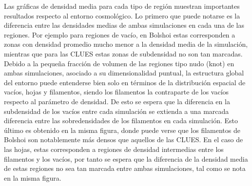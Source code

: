 Las gráficas de densidad media para cada tipo de región muestran 
importantes resultados respecto al entorno cosmológico. Lo primero que 
puede notarse es la diferencia entre las densidades medias de ambas 
simulaciones en cada una de las regiones. Por ejemplo para regiones de 
vacío, en Bolshoi estas corresponden a zonas con densidad promedio mucho 
menor a la densidad media de la simulación, mientras que para las CLUES 
estas zonas de subdensidad no son tan marcadas. Debido a la pequeña 
fracción de volumen de las regiones tipo nudo (knot) en ambas 
simu\-laciones, asociado a su dimensionalidad puntual, la estructura 
global del entorno puede entenderse bien solo en términos de la 
distribución espacial de vacíos, hojas y filamentos, siendo los 
filamentos la contraparte de los vacíos respecto al parámetro de densidad. 
De esto se espera que la diferencia en la subdensidad de los vacíos entre
cada simulación se extienda a una marcada diferencia entre las 
sobredensidades de los filamentos en cada simulación. Esto último es 
obtenido en la misma figura, donde puede verse que los filamentos de 
Bolshoi son notablemente más densos que aquellos de las CLUES. En el caso
de las hojas, estas corresponden a regiones de densidad intermedias entre
los filamentos y los vacíos, por tanto se espera que la diferencia de
la densidad media de estas regiones no sea tan marcada entre ambas 
simulaciones, tal como se nota en la misma figura.


